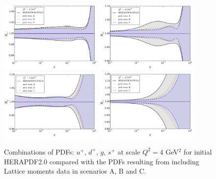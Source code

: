 \begin{figure}[!t]
\centering
\includegraphics[width=0.45\textwidth]{plots/ratio_uPubar_Q2.pdf}
\includegraphics[width=0.45\textwidth]{plots/ratio_dPdbar_Q2.pdf}
\\
\includegraphics[width=0.45\textwidth]{plots/ratio_g_Q2.pdf}
\includegraphics[width=0.45\textwidth]{plots/ratio_sPsbar_Q2.pdf}
\caption{\small Combinations of PDFs: $u^+$, $d^+$, $g$, $s^+$ at scale $Q^2=4$ GeV$^2$
for initial HERAPDF2.0 compared with the PDFs resulting from including Lattice moments
data in scenarios A, B and C.
}
\label{fig:pdfsProf}
\end{figure}


